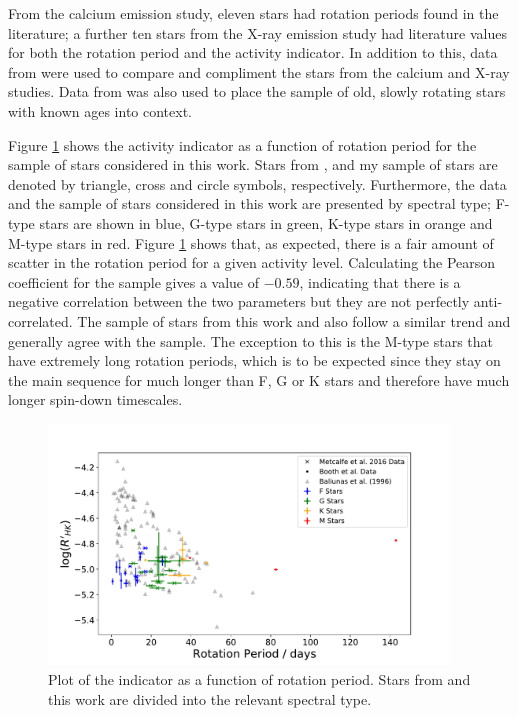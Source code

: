 From the calcium emission study, eleven stars had rotation periods found in the literature; a further ten stars from the X-ray emission study had literature values for both the rotation period and the \Rprime activity indicator. In addition to this, data from \citet{Metcalfe_etal_2016} were used to compare and compliment the stars from the calcium and X-ray studies. Data from \citet{Baliunas_etal_1996} was also used to place the sample of old, slowly rotating stars with known ages into context.

Figure \ref{fig:rhk_v_rot} shows the \Rprime activity indicator as a function of rotation period for the sample of stars considered in this work. Stars from \citet{Baliunas_etal_1996}, \citet{Metcalfe_etal_2016} and my sample of stars are denoted by triangle, cross and circle symbols, respectively. Furthermore, the \citet{Metcalfe_etal_2016} data and the sample of stars considered in this work are presented by spectral type; F-type stars are shown in blue, G-type stars in green, K-type stars in orange and M-type stars in red. Figure \ref{fig:rhk_v_rot} shows that, as expected, there is a fair amount of scatter in the rotation period for a given activity level. Calculating the Pearson coefficient for the \citet{Baliunas_etal_1996} sample gives a value of $-0.59$, indicating that there is a negative correlation between the two parameters but they are not perfectly anti-correlated. The sample of stars from this work and \citet{Metcalfe_etal_2016} also follow a similar trend and generally agree with the \citet{Baliunas_etal_1996} sample. The exception to this is the M-type stars that have extremely long rotation periods, which is to be expected since they stay on the main sequence for much longer than F, G or K stars and therefore have much longer spin-down timescales.

\begin{figure}
    \centering
    \includegraphics[width=0.95\textwidth]{Figures/5-Activity_rotation/Rhk_v_prot.pdf}
    \caption[\Rprime indicator as a function of rotation period]{Plot of the \Rprime indicator as a function of rotation period. Stars from \citet{Metcalfe_etal_2016} and this work are divided into the relevant spectral type.}
    \label{fig:rhk_v_rot}
\end{figure}

